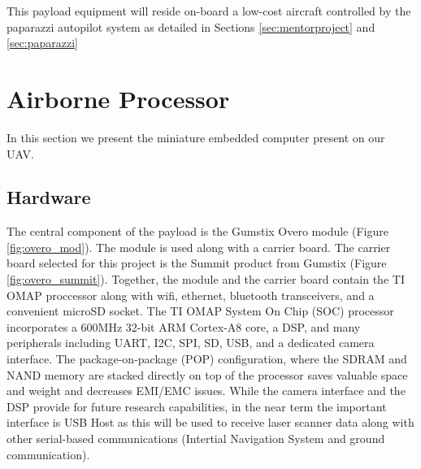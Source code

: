 \documentclass[a4paper,11pt]{report}
\begin{document}
\begin{figure}[htb]
  \centering
  \caption{}
  \label{fig:sensors}
\end{figure}

This payload equipment will reside on-board a low-cost aircraft controlled by the paparazzi autopilot system as detailed in Sections \ref{sec:mentorproject} and \ref{sec:paparazzi}

\section{Airborne Processor}
\label{sec:AirborneProcessor}

In this section we present the miniature embedded computer present on our UAV.

\subsection{Hardware}

The central component of the payload is the Gumstix Overo module (Figure \ref{fig:overo_mod}). The module is used along with a carrier board. The carrier board selected for this project is the Summit product from Gumstix (Figure \ref{fig:overo_summit}). Together, the module and the carrier board contain the TI OMAP proccessor along with wifi, ethernet, bluetooth transceivers, and a convenient microSD socket. The TI OMAP System On Chip (SOC) processor incorporates a 600MHz 32-bit ARM Cortex-A8 core, a DSP, and many peripherals including UART, I2C, SPI, SD, USB, and a dedicated camera interface. The package-on-package (POP) configuration, where the SDRAM and NAND memory are stacked directly on top of the processor saves valuable space and weight and decreases EMI/EMC issues. While the camera interface and the DSP provide for future research capabilities, in the near term the important interface is USB Host as this will be used to receive laser scanner data along with other serial-based communications (Intertial Navigation System and ground communication).
\end{document}
